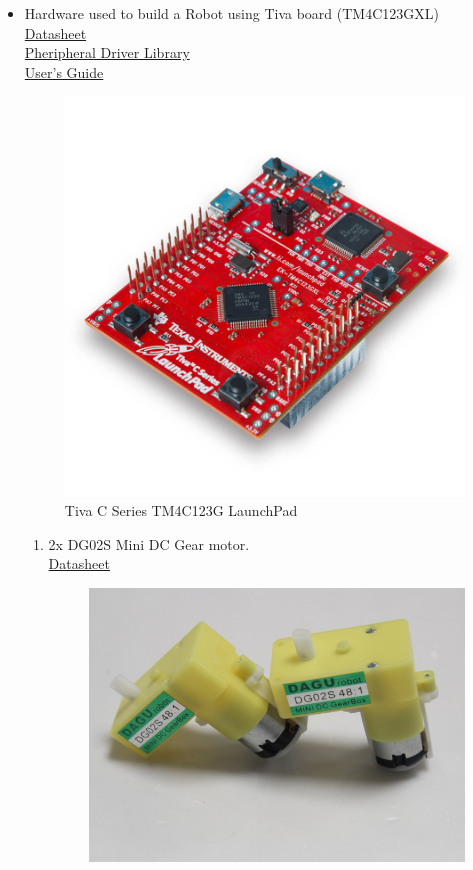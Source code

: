 \documentclass[a4paper,12pt,oneside]{book}
\begin{document}
\begin{itemize}
  \item Hardware used to build a Robot using Tiva board (TM4C123GXL)\\
  \href{http://www.ti.com.cn/cn/lit/ds/symlink/tm4c123gh6pm.pdf}{ Datasheet}\\
  \href{http://www.ti.com/lit/ug/spmu298a/spmu298a.pdff}{ Pheripheral Driver Library}\\
  \href{http://www.mouser.com/ds/2/405/spmu296-242111.pdf}{User's Guide}
  \begin{figure}[h]
        \centering
        \includegraphics[scale=0.2]{Tiva}
        \caption{Tiva C Series TM4C123G LaunchPad}
      \end{figure}
       \newpage
  \begin{enumerate}
   \item 2x DG02S Mini DC Gear motor.\\
   \href{http://cdn.sparkfun.com/datasheets/Robotics/DG02S.pdf}{ Datasheet}
   \begin{figure}[!ht]
        \centering
        \includegraphics[scale=0.25]{motor}

\end{figure}
\end{enumerate}
\end{itemize}
\end{document}
